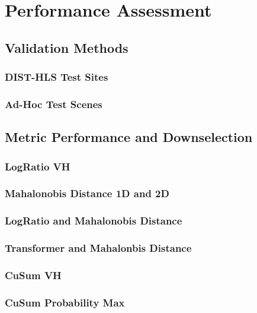 \documentclass[11pt]{article}
\begin{document}
\section{Performance Assessment}

\subsection{Validation Methods}

\subsubsection{DIST-HLS Test Sites}
\subsubsection{Ad-Hoc Test Scenes}

\subsection{Metric Performance and Downselection}

\subsubsection{LogRatio VH}
\subsubsection{Mahalonobis Distance 1D and 2D}
\subsubsection{LogRatio and Mahalonobis Distance}
\subsubsection{Transformer and Mahalonbis Distance}
\subsubsection{CuSum VH}
\subsubsection{CuSum Probability Max}

\end{document}
